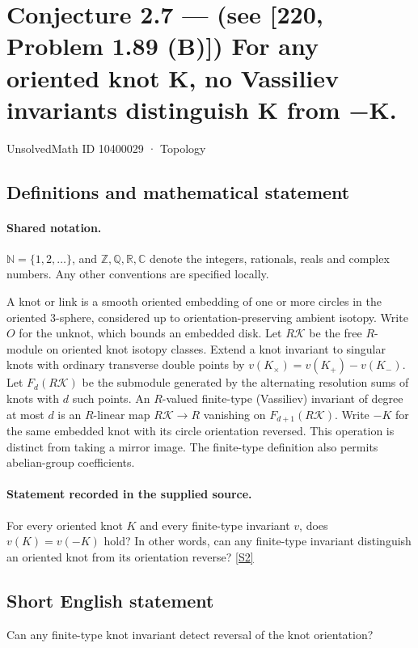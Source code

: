 \documentclass[11pt]{article}
\newcommand{\sref}[2]{\hyperlink{source:#1:#2}{[S#2]}}
\begin{document}
\setcounter{section}{10400028}
\section{Conjecture 2.7 — (see [220, Problem 1.89 (B)]) For any oriented knot K, no Vassiliev invariants distinguish K from −K.}\label{10400029}
{\small\sffamily UnsolvedMath ID 10400029 · Topology}
\subsection{Definitions and mathematical statement}

\paragraph{Shared notation.}$\mathbb N=\{1,2,\ldots\}$, and $\mathbb Z,\mathbb Q,\mathbb R,\mathbb C$ denote the integers, rationals, reals and complex numbers. Any other conventions are specified locally.


A knot or link is a smooth oriented embedding of one or more circles in the oriented $3$-sphere, considered up to orientation-preserving ambient isotopy. Write $O$ for the unknot, which bounds an embedded disk. Let $R\mathcal K$ be the free $R$-module on oriented knot isotopy classes. Extend a knot invariant to singular knots with ordinary transverse double points by $v(K_\times)=v(K_+)-v(K_-)$. Let $F_d(R\mathcal K)$ be the submodule generated by the alternating resolution sums of knots with $d$ such points. An $R$-valued finite-type (Vassiliev) invariant of degree at most $d$ is an $R$-linear map $R\mathcal K\to R$ vanishing on $F_{d+1}(R\mathcal K)$. Write $-K$ for the same embedded knot with its circle orientation reversed. This operation is distinct from taking a mirror image. The finite-type definition also permits abelian-group coefficients.
\paragraph{Statement recorded in the supplied source.}
For every oriented knot $K$ and every finite-type invariant $v$, does $v(K)=v(-K)$ hold? In other words, can any finite-type invariant distinguish an oriented knot from its orientation reverse? \sref{10400029}{2}
\subsection{Short English statement}
Can any finite-type knot invariant detect reversal of the knot orientation?
\end{document}
